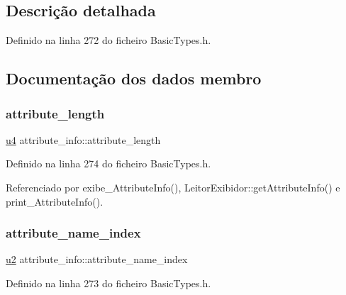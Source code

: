 \subsection{Descrição detalhada}


Definido na linha 272 do ficheiro Basic\+Types.\+h.



\subsection{Documentação dos dados membro}
\mbox{\label{structattribute__info_a1ed8f679458c4bb0ed3315721588f50d}} 
\subsubsection{\texorpdfstring{attribute\+\_\+length}{attribute\_length}}
{\footnotesize\ttfamily \hyperlink{BasicTypes_8h_ae5be1f726785414dd1b77d60df074c9d}{u4} attribute\+\_\+info\+::attribute\+\_\+length}



Definido na linha 274 do ficheiro Basic\+Types.\+h.



Referenciado por exibe\+\_\+\+Attribute\+Info(), Leitor\+Exibidor\+::get\+Attribute\+Info() e print\+\_\+\+Attribute\+Info().

\mbox{\label{structattribute__info_a19df9d4b42eb55ca5dc1bed98df89378}} 
\subsubsection{\texorpdfstring{attribute\+\_\+name\+\_\+index}{attribute\_name\_index}}
{\footnotesize\ttfamily \hyperlink{BasicTypes_8h_a732cde1300aafb73b0ea6c2558a7a54f}{u2} attribute\+\_\+info\+::attribute\+\_\+name\+\_\+index}



Definido na linha 273 do ficheiro Basic\+Types.\+h.



